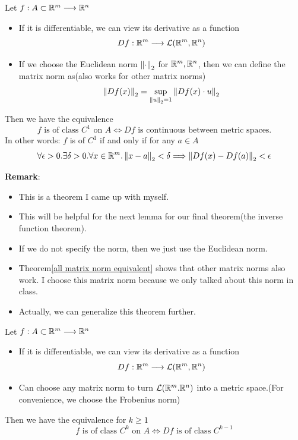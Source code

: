 \begin{theorem*}\label{TIFlemma1}
    Let $f:A \subset \mathbb{R}^m\longrightarrow\mathbb{R}^n$
    \begin{itemize}
        \item If it is differentiable, we can view its derivative as a function $$Df:\mathbb{R}^m\longrightarrow\mathcal{L}(\mathbb{R}^m,\mathbb{R}^n)$$
        \item If we choose the Euclidean norm $\left\lVert \cdot \right\rVert_2$ for $\mathbb{R}^m,\mathbb{R}^n$, then we can define the matrix norm as(also works for other matrix norms) $$\left\lVert Df(x) \right\rVert_2=\sup_{\left\lVert u \right\rVert_2=1}\left\lVert Df(x)\cdot u \right\rVert_2$$
    \end{itemize}
    Then we have the equivalence
    $$f\text{ is of class }C^1 \text{ on }A \Longleftrightarrow Df \text{ is continuous between metric spaces.}$$
    In other words: $f$ is of $C^1$ if and only if for any $a\in A$
    $$\forall \epsilon>0. \exists \delta>0.\forall x \in \mathbb{R}^m. \left\lVert x-a \right\rVert_2<\delta \Longrightarrow \left\lVert Df(x)-Df(a) \right\rVert_2<\epsilon$$
\end{theorem*}
\noindent \textbf{Remark}:
\begin{itemize}
    \item This is a theorem I came up with myself.
    \item This will be helpful for the next lemma for our final theorem(the inverse function theorem).
    \item If we do not specify the norm, then we just use the Euclidean norm.
    \item Theorem\ref{all matrix norm equivalent} shows that other matrix norms also work. I choose this matrix norm because we only talked about this norm in class.
    \item Actually, we can generalize this theorem further.
\end{itemize}

\begin{theorem*}\label{TIFlemma1.5}
    Let $f:A \subset \mathbb{R}^m\longrightarrow\mathbb{R}^n$
    \begin{itemize}
        \item If it is differentiable, we can view its derivative as a function $$Df:\mathbb{R}^m\longrightarrow\mathcal{L}(\mathbb{R}^m,\mathbb{R}^n)$$
        \item Can choose any matrix norm to turn $\mathcal{L}(\mathbb{R}^m.\mathbb{R}^n)$ into a metric space.(For convenience, we choose the Frobenius norm)
    \end{itemize}
    Then we have the equivalence for $k \geq 1$
    $$f\text{ is of class }C^k \text{ on }A \Longleftrightarrow Df \text{ is of class } C^{k-1}$$
\end{theorem*}

